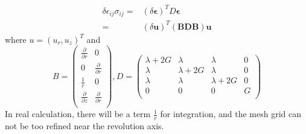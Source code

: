 \documentclass{article}
\begin{document}
\begin{align}
\delta{\epsilon}_{ij}\sigma_{ij}=&(\delta \bm{\epsilon})^T D \bm{\epsilon}\\
=&(\delta \bm{u})^T (\bm{B}\bm{D}\bm{B})\bm{u}
\end{align}
where $u=(u_r,u_z)^T$ and 
\[
B= \left(\begin{matrix}
\frac{\partial}{\partial r} & 0\\
0 & \frac{\partial}{\partial r}\\
\frac{1}{r} & 0\\
\frac{\partial}{\partial z}&\frac{\partial}{\partial r}\\
\end{matrix}\right),D=\left(\begin{matrix}
\lambda+2G & \lambda&\lambda&0\\
\lambda & \lambda+2G&\lambda&0\\
\lambda & \lambda&\lambda+2G&0\\
0&0&0&G\\
\end{matrix}\right)
\]
In real calculation, there will be a term $\frac{1}{r}$ for integration, and the mesh grid can not be too refined near the revolution axis.
\end{document}
